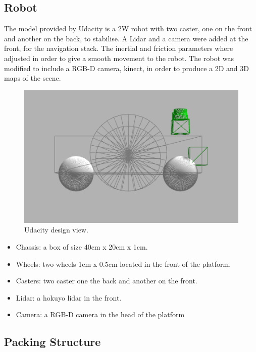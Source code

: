 \documentclass[10pt,journal,compsoc]{IEEEtran}
\begin{document}
\subsection{Robot}
The model provided by Udacity is a 2W robot with two caster, one on the front and another on the back, to stabilise. A Lidar and a camera were added at the front, for the navigation stack. The inertial and friction parameters where adjusted in order to give a smooth movement to the robot. The robot was modified to include a RGB-D camera, kinect, in order to produce a 2D and 3D maps of the scene.
\begin{figure}[h]
\centering
\includegraphics[scale=0.33]{udacity-design-2}
\caption{Udacity design view.}
\label{fig:mesh1}
\end{figure}
\begin{itemize}
\item Chassis: a box of size 40cm x 20cm x 1cm.
\item Wheels: two wheels 1cm x 0.5cm located in the front of the platform.
\item Casters: two caster one the back and another on the front.
\item Lidar: a hokuyo lidar in the front.
\item Camera: a RGB-D camera in the head of the platform
\end{itemize}




\subsection{Packing Structure}
\end{document}
